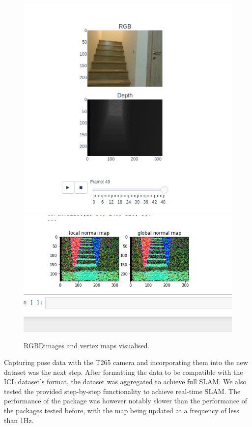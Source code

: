 \documentclass{article}
\begin{document}
\begin{figure}[h] %
    \centering
	\includegraphics[width=\textwidth,height=\textheight,keepaspectratio]{report1-img019.png} %
	\includegraphics[width=\textwidth,height=\textheight,keepaspectratio,trim={0 4cm 0 1cm},clip]{report1-img020.png} %
	\caption{RGBDimages and vertex maps visualised. }
\end{figure}

\clearpage

Capturing pose data with the T265 camera and incorporating them into the new dataset was the next step. After formatting the data to be compatible with the ICL dataset’s format, the dataset was aggregated to achieve full SLAM. We also tested the provided step-by-step functionality to achieve real-time SLAM. The performance of the package was however notably slower than the performance of the packages tested before, with the map being updated at a frequency of less than 1Hz. 
\end{document}
